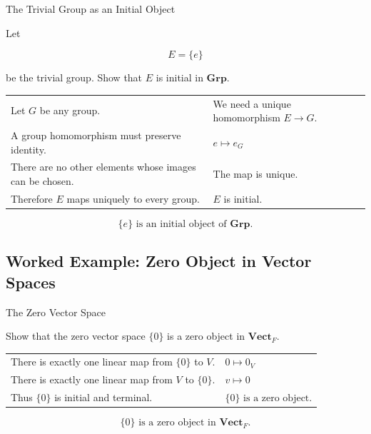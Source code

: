 \begin{workedexamplebox}{The Trivial Group as an Initial Object}

Let

\[ E=\{e\} \]

be the trivial group. Show that \(E\) is initial in \(\mathbf{Grp}\).

\begin{tabularx}{\textwidth}{@{}>{\raggedright\arraybackslash}p{}X@{}}
Let \(G\) be any group. & We need a unique homomorphism \(E\to G\).\\
A group homomorphism must preserve identity. & \(e\mapsto e_G\)\\
There are no other elements whose images can be chosen. &
The map is unique.\\
Therefore \(E\) maps uniquely to every group. & \(E\) is initial.
\end{tabularx}

\begin{answerbox}
\[ \boxed{\{e\}\text{ is an initial object of }\mathbf{Grp}.} \]
\end{answerbox}
\end{workedexamplebox}

\subsection{Worked Example: Zero Object in Vector Spaces}
\label{subsec:worked-zero-vector-space}

\begin{workedexamplebox}{The Zero Vector Space}

Show that the zero vector space \(\{0\}\) is a zero object in
\(\mathbf{Vect}_F\).

\begin{tabularx}{\textwidth}{@{}>{\raggedright\arraybackslash}p{}X@{}}
There is exactly one linear map from \(\{0\}\) to \(V\). &
\(0\mapsto0_V\)\\
There is exactly one linear map from \(V\) to \(\{0\}\). &
\(v\mapsto0\)\\
Thus \(\{0\}\) is initial and terminal. &
\(\{0\}\text{ is a zero object.}\)
\end{tabularx}

\begin{answerbox}
\[ \boxed{\{0\}\text{ is a zero object in }\mathbf{Vect}_F.} \]
\end{answerbox}
\end{workedexamplebox}


